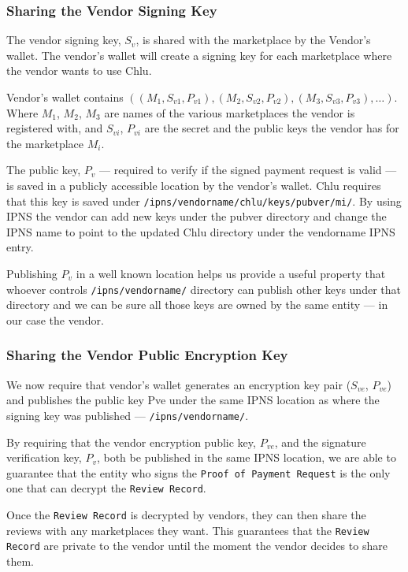 \documentclass[a4paper]{article}
\begin{document}
\subsubsection{Sharing the Vendor Signing Key}

The vendor signing key, $S_v$, is shared with the marketplace by the
Vendor's wallet. The vendor's wallet will create a signing key for
each marketplace where the vendor wants to use Chlu.

Vendor's wallet contains $((M_1, S_{v1}, P_{v1}), (M_2, S_{v2},
P_{v2}), (M_3,S_{v3},P_{v3}), \ldots)$. Where $M_1$, $M_2$, $M_3$ are
names of the various marketplaces the vendor is registered with, and
$S_{vi}$, $P_{vi}$ are the secret and the public keys the vendor has
for the marketplace $M_i$.

The public key, $P_v$ --- required to verify if the signed payment
request is valid --- is saved in a publicly accessible location by the
vendor's wallet. Chlu requires that this key is saved under
\texttt{/ipns/vendorname/chlu/keys/pubver/mi/}. By using IPNS the vendor
can add new keys under the pubver directory and change the IPNS name
to point to the updated Chlu directory under the vendorname IPNS
entry.

Publishing $P_v$ in a well known location helps us provide a useful
property that whoever controls \texttt{/ipns/vendorname/} directory can
publish other keys under that directory and we can be sure all those
keys are owned by the same entity --- in our case the vendor.

\subsubsection{Sharing the Vendor Public Encryption Key}

We now require that vendor's wallet generates an encryption key pair
($S_{ve}$, $P_{ve}$) and publishes the public key Pve under the same
IPNS location as where the signing key was published ---
\texttt{/ipns/vendorname/}.

By requiring that the vendor encryption public key, $P_{ve}$, and the
signature verification key, $P_v$, both be published in the same IPNS
location, we are able to guarantee that the entity who signs the
\texttt{Proof of Payment Request} is the only one that can decrypt the
\texttt{Review Record}.

Once the \texttt{Review Record} is decrypted by vendors, they can then
share the reviews with any marketplaces they want. This guarantees
that the \texttt{Review Record} are private to the vendor until the
moment the vendor decides to share them.
\end{document}

